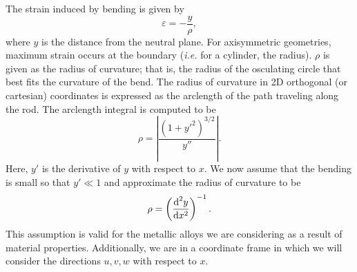 \noindent The strain induced by bending is given by
\begin{equation}
\varepsilon = -\frac{y}{\rho},
\label{eq:strain.bend.basic}
\end{equation}
where $y$ is the distance from the neutral plane. For axisymmetric geometries, maximum strain occurs at the boundary (\emph{i.e.} for a cylinder, the radius). $\rho$ is given as the radius of curvature; that is, the radius of the osculating circle that best fits the curvature of the bend. The radius of curvature in 2D orthogonal (or cartesian) coordinates is expressed as the arclength of the path traveling along the rod.  The arclength integral is computed to be 
\begin{equation}
\rho = \left|\frac{(1+{y'}^2)^{3/2}}{y''}\right|.
\end{equation}
Here, $y'$ is the derivative of $y$ with respect to $x$. We now assume that the bending is small so that $y'\ll1$ and approximate the radius of curvature to be
\begin{equation}
\rho = \left(\frac{\text d^2y}{\text dx^2}\right)^{-1}.
\label{eq:radius.curvature}
\end{equation}
This assumption is valid for the metallic alloys we are considering as a result of material properties. Additionally, we are in a coordinate frame in which we will consider the directions $u,v,w$ with respect to $x$.

